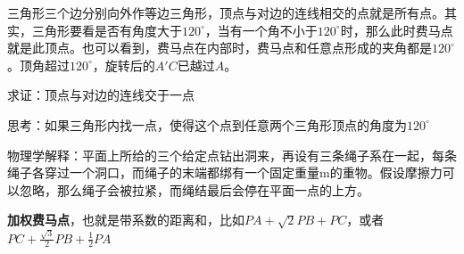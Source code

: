 \documentclass[../main.tex]{subfiles}
\begin{document}
三角形三个边分别向外作等边三角形，顶点与对边的连线相交的点就是所有点。其实，三角形要看是否有角度大于$120^{\circ}$，当有一个角不小于$120^{\circ}$时，那么此时费马点就是此顶点。也可以看到，费马点在内部时，费马点和任意点形成的夹角都是$120^{\circ}$。顶角超过$120^{\circ}$，旋转后的$A'C$已越过$A$。

求证：顶点与对边的连线交于一点

思考：如果三角形内找一点，使得这个点到任意两个三角形顶点的角度为$120^{\circ}$

物理学解释：平面上所给的三个给定点钻出洞来，再设有三条绳子系在一起，每条绳子各穿过一个洞口，而绳子的末端都绑有一个固定重量m的重物。假设摩擦力可以忽略，那么绳子会被拉紧，而绳结最后会停在平面一点的上方。

\textbf{加权费马点}，也就是带系数的距离和，比如$PA+\sqrt{2}PB+PC$，或者$PC+\frac{\sqrt{3}}{2}PB+\frac{1}{2}PA$
\end{document}
